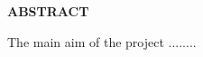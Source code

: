 \documentclass[12pt,a4wide]{report}
\theoremstyle{plain}
\theoremstyle{definition}
\theoremstyle{remark}
\begin{document}
\begin{center}
{\Large{\bf{ABSTRACT}}}
\end{center}


The main aim of the project ........

\clearpage



\tableofcontents
\clearpage
\listoffigures
\listoftables


\newpage

\setcounter{page}{1}








\nocite{golub} \nocite{gerla}\nocite{m1}\nocite{chang}


\end{document}

